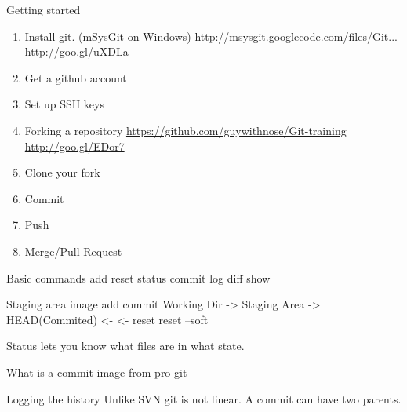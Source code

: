 \documentclass[14pt]{beamer}
\begin{document}
\begin{frame}{Getting started}
	\begin{enumerate}
		\small
		\item Install git. (mSysGit on Windows)\newline
		\href{http://msysgit.googlecode.com/files/Git-1.7.11-preview20120710.exe}{http://msysgit.googlecode.com/files/Git...}
		\href{http://goo.gl/uXDLa}{http://goo.gl/uXDLa}
		\item Get a github account
		\item Set up SSH keys
		\item Forking a repository\newline
		\href{https://github.com/guywithnose/Git-training}{https://github.com/guywithnose/Git-training}
		\href{http://goo.gl/EDor7}{http://goo.gl/EDor7}
		\item Clone your fork
		\item Commit
		\item Push
		\item Merge/Pull Request
	\end{enumerate}
\end{frame}


\begin{frame}{Basic commands}
	add
	reset
	status
	commit
	log
	diff
	show
\end{frame}

\begin{frame}{Staging area}
	image
           add            commit
Working Dir -> Staging Area -> HEAD(Commited)
            <-              <-
          reset        reset --soft

Status lets you know what files are in what state.
\end{frame}

\begin{frame}{What is a commit}
	image from pro git
\end{frame}

\begin{frame}{Logging the history}
	Unlike SVN git is not linear.  A commit can have two parents.
\end{frame}
\end{document}
